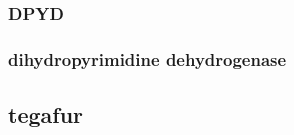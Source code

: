 \documentclass{book}
\begin{document}
\subsubsection{ DPYD }
\subsubsection{ dihydropyrimidine dehydrogenase }

\subsection{ tegafur }
\end{document}
